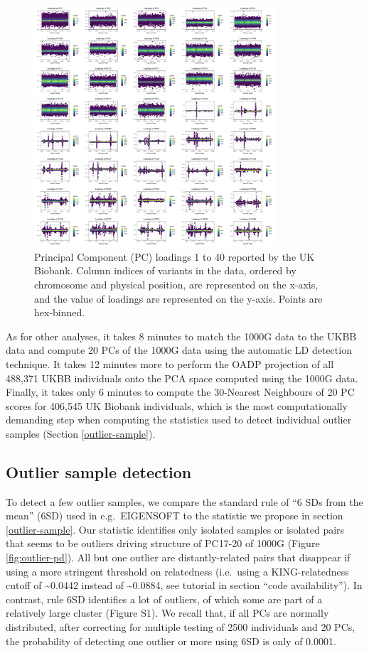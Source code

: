 \documentclass{bioinfo}
\begin{document}
\begin{figure}[htb]
\centerline{\includegraphics[width=0.8\textwidth]{UKBB-loadings1-40.pdf}}
\caption{Principal Component (PC) loadings 1 to 40 reported by the UK Biobank.
Column indices of variants in the data, ordered by chromosome and physical position, are represented on the x-axis, and the value of loadings are represented on the y-axis.
Points are hex-binned.
\label{fig:UKBB-loadings40}}
\end{figure}

As for other analyses, it takes 8 minutes to match the 1000G data to the UKBB data and compute 20 PCs of the 1000G data using the automatic LD detection technique. It takes 12 minutes more to perform the OADP projection of all 488,371 UKBB individuals onto the PCA space computed using the 1000G data.
Finally, it takes only 6 minutes to compute the 30-Nearest Neighbours of 20 PC scores for 406,545 UK Biobank individuals, which is the most computationally demanding step when computing the statistics used to detect individual outlier samples (Section \ref{outlier-sample}).

\subsection{Outlier sample detection}

To detect a few outlier samples, we compare the standard rule of ``6 SDs from the mean'' (6SD) used in e.g.\ EIGENSOFT to the statistic we propose in section \ref{outlier-sample}.
Our statistic identifies only isolated samples or isolated pairs that seems to be outliers driving structure of PC17-20 of 1000G (Figure \ref{fig:outlier-pd}). 
All but one outlier are distantly-related pairs that disappear if using a more stringent threshold on relatedness (i.e.\ using a KING-relatedness cutoff of \textasciitilde0.0442 instead of \textasciitilde0.0884, see tutorial in section ``code availability''). 
In contrast, rule 6SD identifies a lot of outliers, of which some are part of a relatively large cluster (Figure S1).
We recall that, if all PCs are normally distributed, after correcting for multiple testing of 2500 individuals and 20 PCs, the probability of detecting one outlier or more using 6SD is only of 0.0001.
\end{document}
